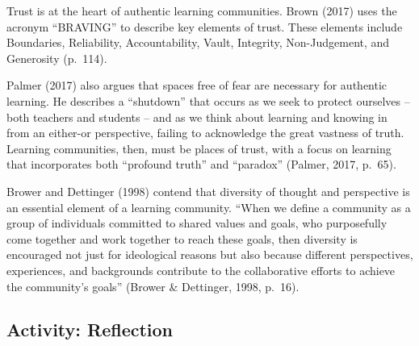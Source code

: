 \documentclass[
]{book}
\begin{document}
Trust is at the heart of authentic learning communities. Brown (2017) uses the acronym ``BRAVING'' to describe key elements of trust. These elements include Boundaries, Reliability, Accountability, Vault, Integrity, Non-Judgement, and Generosity (p.~114).

Palmer (2017) also argues that spaces free of fear are necessary for authentic learning. He describes a ``shutdown'' that occurs as we seek to protect ourselves -- both teachers and students -- and as we think about learning and knowing in from an either-or perspective, failing to acknowledge the great vastness of truth. Learning communities, then, must be places of trust, with a focus on learning that incorporates both ``profound truth'' and ``paradox'' (Palmer, 2017, p.~65).

Brower and Dettinger (1998) contend that diversity of thought and perspective is an essential element of a learning community. ``When we define a community as a group of individuals committed to shared values and goals, who purposefully come together and work together to reach these goals, then diversity is encouraged not just for ideological reasons but also because different perspectives, experiences, and backgrounds contribute to the collaborative efforts to achieve the community's goals'' (Brower \& Dettinger, 1998, p.~16).

\hypertarget{activity-reflection}{%
\subsection*{Activity: Reflection}\label{activity-reflection}}
\end{document}
